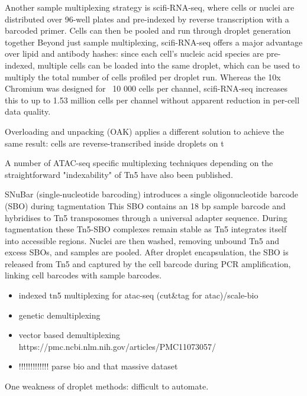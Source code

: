 Another sample multiplexing strategy is scifi-RNA-seq, where cells or nuclei are distributed over 96-well plates and pre-indexed by reverse transcription with a barcoded primer. Cells can then be pooled and run through droplet generation together Beyond just sample multiplexing, scifi-RNA-seq offers a major advantage over lipid and antibody hashes: since each cell's nucleic acid species are pre-indexed, multiple cells can be loaded into the same droplet, which can be used to multiply the total number of cells profiled per droplet run. Whereas the 10x Chromium was designed for ~10 000 cells per channel, scifi-RNA-seq increases this to up to 1.53 million cells per channel without apparent reduction in per-cell data quality.

Overloading and unpacking (OAK) applies a different solution to achieve the same result: cells are reverse-transcribed inside droplets on t

A number of ATAC-seq specific multiplexing techniques depending on the straightforward "indexability" of Tn5 have also been published.


SNuBar (single-nucleotide barcoding) introduces a single oligonucleotide barcode (SBO) during tagmentation This SBO contains an 18 bp sample barcode and hybridises to Tn5 transposomes through a universal adapter sequence. During tagmentation these Tn5-SBO complexes remain stable as Tn5 integrates itself into accessible regions. Nuclei are then washed, removing unbound Tn5 and excess SBOs, and samples are pooled. After droplet encapsulation, the SBO is released from Tn5 and captured by the cell barcode during PCR amplification, linking cell barcodes with sample barcodes.

\begin{itemize}[noitemsep]
    \item indexed tn5 multiplexing for atac-seq (cut\&tag for atac)/scale-bio
    \item genetic demultiplexing
    \item vector based demultiplexing https://pmc.ncbi.nlm.nih.gov/articles/PMC11073057/
    \item !!!!!!!!!!!!! parse bio and that massive dataset
\end{itemize}

One weakness of droplet methods: difficult to automate.

